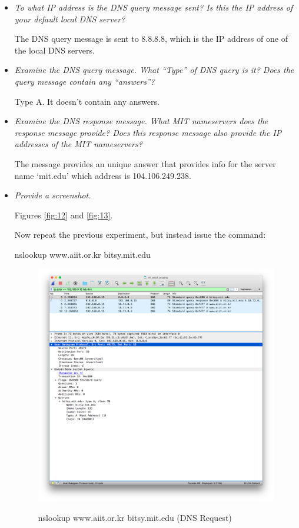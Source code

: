 \documentclass[11pt]{article}
\begin{document}
\begin{itemize}
\pagebreak

	\item
		\textit{To what IP address is the DNS query message sent? Is this the IP address of your default local DNS server?}
		\par The DNS query message is sent to 8.8.8.8, which is the IP address of one of the local DNS servers.
		
	\item
		\textit{Examine the DNS query message. What “Type” of DNS query is it? Does the query message contain any “answers”?}
		\par Type A. It doesn't contain any answers.
		
	\item
		\textit{Examine the DNS response message. What MIT nameservers does the response message provide? Does this response message also provide the IP addresses of the MIT nameservers?}
		\par The message provides an unique answer that provides info for the server name `mit.edu' which address is 104.106.249.238.
		
	\item
		\textit{Provide a screenshot.}
		\par Figures \ref{fig:12} and \ref{fig:13}.
		
\pagebreak

\par Now repeat the previous experiment, but instead issue the command:
\par nslookup www.aiit.or.kr bitsy.mit.edu

		\begin{figure}[H]
		\centering
		\caption{nslookup www.aiit.or.kr bitsy.mit.edu (DNS Request)}
		\includegraphics[width=460px]{14}
		\label{fig:14}
		\end{figure}
		

\end{itemize}
\end{document}

